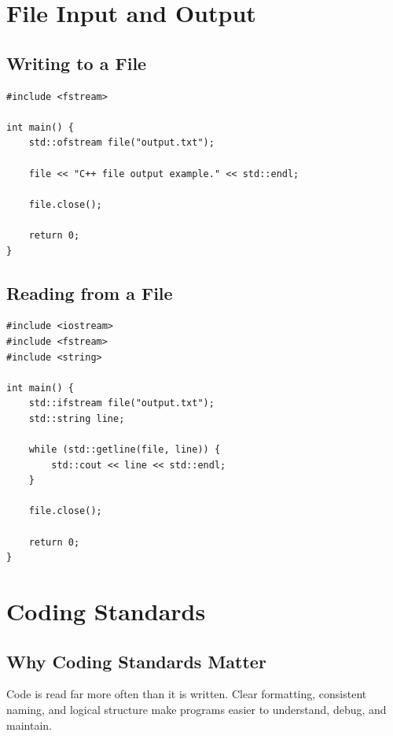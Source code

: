 \documentclass[10pt]{report}
\begin{document}
\section{File Input and Output}

\subsection{Writing to a File}

\begin{lstlisting}[caption={Write to File}]
#include <fstream>

int main() {
    std::ofstream file("output.txt");

    file << "C++ file output example." << std::endl;

    file.close();

    return 0;
}
\end{lstlisting}

\subsection{Reading from a File}

\begin{lstlisting}[caption={Read from File}]
#include <iostream>
#include <fstream>
#include <string>

int main() {
    std::ifstream file("output.txt");
    std::string line;

    while (std::getline(file, line)) {
        std::cout << line << std::endl;
    }

    file.close();

    return 0;
}
\end{lstlisting}

\section{Coding Standards}

\subsection{Why Coding Standards Matter}

Code is read far more often than it is written. Clear formatting, consistent naming, and logical structure make programs easier to understand, debug, and maintain.
\end{document}
